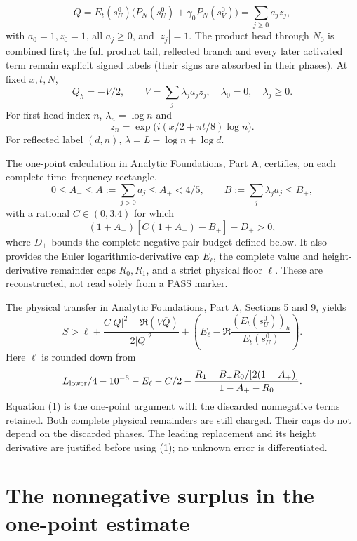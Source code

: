 \documentclass[11pt,a4paper]{article}
\begin{document}
\[
 Q=E_t(s_U^0)\big(P_N(s_U^0)+\gamma_0P_N(s_V^0)\big)
   =\sum_{j\ge0}a_jz_j,
\]
with \(a_0=1,z_0=1\), all \(a_j\ge0\), and \(|z_j|=1\).
The product head through \(N_0\) is combined first; the full product tail,
reflected branch and every later activated term remain explicit signed
labels (their signs are absorbed in their phases). At fixed \(x,t,N\),
\[
 Q_h=-V/2,\qquad V=\sum_j\lambda_j a_jz_j,
 \quad \lambda_0=0,\quad\lambda_j\ge0.
\]
For first-head index \(n\), \(\lambda_n=\log n\) and
\[
 z_n=\exp\big(i(x/2+\pi t/8)\log n\big).
\]
For reflected label \((d,n)\), \(\lambda=L-\log n+\log d\).

The one-point calculation in Analytic Foundations, Part A, certifies, on each complete time--frequency rectangle,
\[
0\le A_-\le A:=\sum_{j>0}a_j\le A_+<4/5,
\qquad B:=\sum_j\lambda_ja_j\le B_+,
\]
with a rational \(C\in(0,3.4)\) for which
\[
 (1+A_-)[C(1+A_-)-B_+]-D_+>0,
\]
where \(D_+\) bounds the complete negative-pair budget defined below. It also
provides the Euler logarithmic-derivative cap \(E_\ell\), the complete value
and height-derivative remainder caps \(R_0,R_1\), and a strict physical floor
\(\ell\). These are reconstructed, not read solely from a PASS marker.

The physical transfer in Analytic Foundations, Part A, Sections 5 and 9, yields
\[
 S>\ell+
 \frac{C|Q|^2-\Re(V\overline Q)}{2|Q|^2}
 +\left(E_\ell-\Re\frac{(E_t(s_U^0))_h}{E_t(s_U^0)}\right).
 \tag{1}
\]
Here \(\ell\) is rounded down from
\[
 L_{\rm lower}/4-10^{-6}-E_\ell-C/2
 -\frac{R_1+B_+R_0/[2(1-A_+)]}{1-A_+-R_0}.
\]
Equation (1) is the one-point argument with the discarded nonnegative terms
retained. Both complete physical remainders are still charged. Their caps do
not depend on the discarded phases. The leading replacement and its height
derivative are justified before using (1); no unknown error is differentiated.

\section{The nonnegative surplus in the one-point estimate}\label{exact-decomposition-of-the-one-point-cone-surplus}
\end{document}
